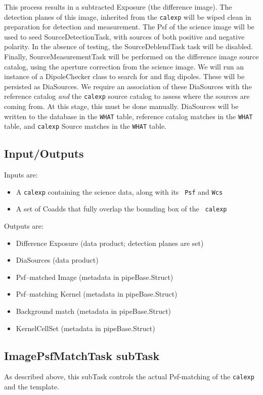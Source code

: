 \documentclass[12pt]{article}
\begin{document}
This process results in a subtracted Exposure (the difference image).
The detection planes of this image, inherited from the {\tt calexp}
will be wiped clean in preparation for detection and measurement.  The
Psf of the science image will be used to seed SourceDetectionTask,
with sources of both positive and negative polarity.  In the absence
of testing, the SourceDeblendTask task will be disabled.  Finally,
SourceMeasurementTask will be performed on the difference image
source catalog, using the aperture correction from the science image.  We
will run an instance of a DipoleChecker class to search for and flag
dipoles.  These will be persisted as DiaSources.  We require an
association of these DiaSources with the reference catalog {\it and}
the {\tt calexp} source catalog to assess where the sources are coming
from.  At this stage, this must be done manually.  DiaSources will be
written to the database in the {\tt WHAT} table, reference catalog
matches in the {\tt WHAT} table, and {\tt calexp} Source matches in
the {\tt WHAT} table.

\subsection{Input/Outputs}

Inputs are:
\begin{itemize}
\item A {\tt calexp} containing the science data, along with its {\tt
  Psf} and {\tt Wcs}
\item A set of Coadds that fully overlap the bounding box of the {\tt
  calexp}
\end{itemize}

Outputs are:
\begin{itemize}
\item Difference Exposure (data product; detection planes are set)
\item DiaSources (data product)
\item Psf--matched Image (metadata in pipeBase.Struct)
\item Psf--matching Kernel (metadata in pipeBase.Struct)
\item Background match (metadata in pipeBase.Struct)
\item KernelCellSet (metadata in pipeBase.Struct)
\end{itemize}

\subsection{ImagePsfMatchTask subTask}
As described above, this subTask controls the actual Psf-matching of
the {\tt calexp} and the template.  
\end{document}
